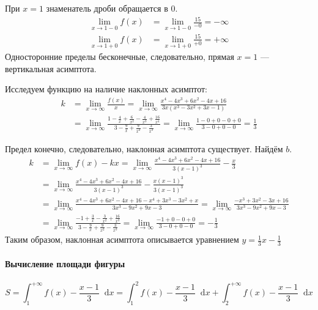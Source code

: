 \documentclass[a4paper,12pt]{article}
\newcommand*\diff{\mathop{}\!\mathrm{d}}
\begin{document}
При \(x = 1\) знаменатель дроби обращается в 0.
\begin{align*}
  \lim_{x \to 1 - 0} f(x) &= \lim_{x \to 1 - 0} \frac{15}{-0} = -\infty \\
  \lim_{x \to 1 + 0} f(x) &= \lim_{x \to 1 + 0} \frac{15}{+0} = +\infty
\end{align*}
Односторонние пределы бесконечные, следовательно,
прямая \(x = 1\) --- вертикальная асимптота.

Исследуем функцию на наличие наклонных асимптот:
\begin{equation*}
\begin{split}
  k &= \lim_{x \to \infty} \frac{f(x)}{x}
     = \lim_{x \to \infty}
        \frac{x^4 - 4 x^3 + 6 x^2 - 4 x + 16}
             {3 x (x^3 - 3 x^2 + 3 x - 1)} \\
    &= \lim_{x \to \infty}
        \frac{1 - \frac{4}{x} + \frac{6}{x^2} - \frac{4}{x^3} + \frac{16}{x^4}}
             {3 - \frac{9}{x} + \frac{9}{x^2} - \frac{3}{x^3}}
     = \lim_{x \to \infty} \frac{1 - 0 + 0 - 0 + 0}{3 - 0 + 0 - 0}
     = \frac{1}{3}
\end{split}
\end{equation*}

Предел конечно, следовательно, наклонная асимптота существует.
Найдём \(b\).
\begin{equation*}
\begin{split}
  k &= \lim_{x \to \infty} f(x) - k x
     = \lim_{x \to \infty}
     \frac{x^4 - 4 x^3 + 6 x^2 - 4 x + 16} {3 {(x - 1)}^3}
     - \frac{x}{3} \\
    &= \lim_{x \to \infty}
     \frac{x^4 - 4 x^3 + 6 x^2 - 4 x + 16} {3 {(x - 1)}^3}
     - \frac{x {(x - 1)}^3}{3 {(x - 1)}^3} \\
    &= \lim_{x \to \infty}
     \frac{x^4 - 4 x^3 + 6 x^2 - 4 x + 16 - x^4 + 3 x^3 - 3 x^2 + x}
          {3 x^3 - 9 x^2 + 9 x - 3}
     = \lim_{x \to \infty}
     \frac{-x^3 + 3 x^2 - 3 x + 16}{3 x^3 - 9 x^2 + 9 x - 3} \\
    &= \lim_{x \to \infty}
     \frac{-1 + \frac{3}{x} - \frac{3}{x^2} + \frac{16}{x^3}}
          {3 - \frac{9}{x} + \frac{9}{x^2} - \frac{3}{x^3}}
     = \lim_{x \to \infty}
     \frac{-1 + 0 - 0 + 0}{3 - 0 + 0 - 0}
     = -\frac{1}{3}
\end{split}
\end{equation*}
Таким образом, наклонная асимптота описывается уравнением
\(y = \frac{1}{3} x - \frac{1}{3}\)

\paragraph{Вычисление площади фигуры}
\begin{equation} \label{eq:3-int-s}
  S
  = \int_{1}^{+\infty} f(x) - \frac{x - 1}{3} \diff x
  = \int_{1}^{2} f(x) - \frac{x - 1}{3} \diff x
  + \int_{2}^{+\infty} f(x) - \frac{x - 1}{3} \diff x
\end{equation}
\end{document}
